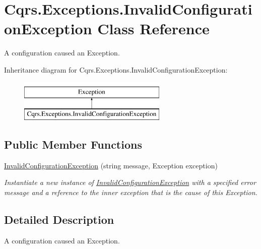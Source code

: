 \hypertarget{classCqrs_1_1Exceptions_1_1InvalidConfigurationException}{}\section{Cqrs.\+Exceptions.\+Invalid\+Configuration\+Exception Class Reference}
\label{classCqrs_1_1Exceptions_1_1InvalidConfigurationException}


A configuration caused an Exception.  


Inheritance diagram for Cqrs.\+Exceptions.\+Invalid\+Configuration\+Exception\+:\begin{figure}[H]
\begin{center}
\leavevmode
\includegraphics[height=2.000000cm]{classCqrs_1_1Exceptions_1_1InvalidConfigurationException}
\end{center}
\end{figure}
\subsection*{Public Member Functions}
\begin{DoxyCompactItemize}
\item 
\hyperlink{classCqrs_1_1Exceptions_1_1InvalidConfigurationException_af632b697236e7a5f3eec24746213dac1_af632b697236e7a5f3eec24746213dac1}{Invalid\+Configuration\+Exception} (string message, Exception exception)
\begin{DoxyCompactList}\small\item\em Instantiate a new instance of \hyperlink{classCqrs_1_1Exceptions_1_1InvalidConfigurationException}{Invalid\+Configuration\+Exception} with a specified error message and a reference to the inner {\itshape exception}  that is the cause of this Exception. \end{DoxyCompactList}\end{DoxyCompactItemize}


\subsection{Detailed Description}
A configuration caused an Exception. 



